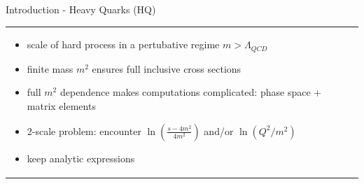 \begin{frame}{Introduction - Heavy Quarks (HQ)}
\begin{tabular}{wi}
\begin{itemize}
\item scale of hard process in a pertubative regime $m>\Lambda_{QCD}$
\item finite mass $m^2$ ensures full inclusive cross sections
\item full $m^2$ dependence makes computations complicated: phase space + matrix elements
\item 2-scale problem: encounter $\ln\left(\frac{s-4m^2}{4m^2}\right)$ and/or $\ln(Q^2/m^2)$
\item keep analytic expressions
\end{itemize}
&
\end{tabular}
\end{frame}

